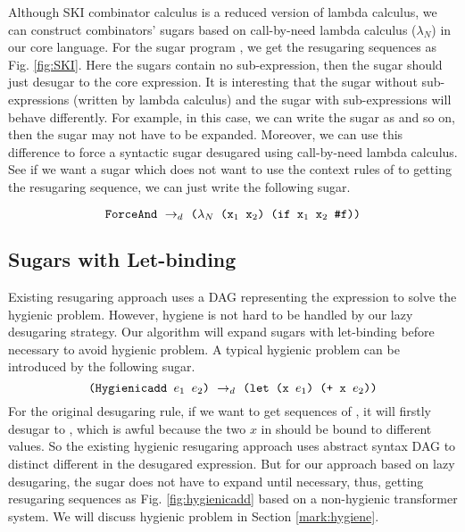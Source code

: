 Although SKI combinator calculus is a reduced version of lambda calculus, we can construct combinators' sugars based on call-by-need lambda calculus ($\lambda_N$) in our core language. For the sugar program , we get the resugaring sequences as Fig.  \ref{fig:SKI}. Here the sugars contain no sub-expression, then the sugar should just desugar to the core expression. It is interesting that the sugar without sub-expressions (written by lambda calculus) and the sugar with sub-expressions will behave differently. For example, in this case, we can write the sugar as  and so on, then the sugar may not have to be expanded. Moreover, we can use this difference to force a syntactic sugar desugared using call-by-need lambda calculus. See if we want a sugar  which does not
want to use the context rules of  to getting the resugaring sequence, we can just write the following sugar.

\[
\texttt{ForceAnd} ~\rightarrow_d~ \texttt{($\lambda_N$ ($\mbox{\tt x}_1$ $\mbox{\tt x}_2$) (if $\mbox{\tt x}_1$ $\mbox{\tt x}_2$ \#f))}
\]






\subsection{Sugars with Let-binding}
\label{mark:hygienic}


Existing resugaring approach \cite{hygienic} uses a DAG representing the expression to solve the hygienic problem. However, hygiene is not hard to be handled by our lazy desugaring strategy. Our algorithm will expand sugars with let-binding before necessary to avoid hygienic problem.
A typical hygienic problem can be introduced by the following sugar.
\[
\texttt{(Hygienicadd $e_1$ $e_2$)} ~\rightarrow_d~ \texttt{(let (x $e_1$) (+ x $e_2$))}
\]
For the original desugaring rule, if we want to get sequences of , it will firstly desugar to , which is awful because the two $x$ in  should be bound to different values. So the existing hygienic resugaring approach uses abstract syntax DAG to distinct different  in the desugared expression. But for our approach based on lazy desugaring, the  sugar does not have to expand until necessary, thus, getting resugaring sequences as Fig.  \ref{fig:hygienicadd} based on a non-hygienic transformer system. We will discuss hygienic problem in Section \ref{mark:hygiene}.


